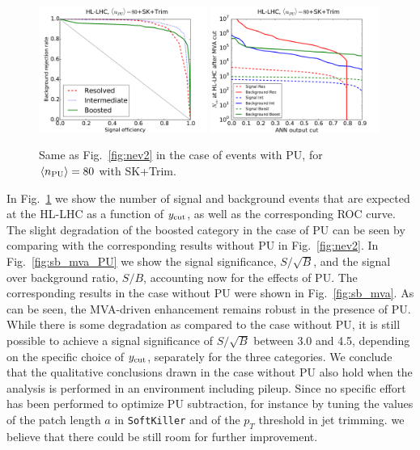 \begin{figure}[t]
  \begin{center}
    \includegraphics[width=0.49\textwidth]{plots/roc_SKPU80.pdf}
\includegraphics[width=0.49\textwidth]{plots/nev2_SKPU80.pdf}
\caption{\small Same as Fig.~\ref{fig:nev2} in the
case of events with PU, for
$\left\langle n_{\rm PU}\right\rangle=80$ with SK+Trim.
}
\label{fig:nev2_PU}
\end{center}
\end{figure}

In Fig.~\ref{fig:nev2_PU}
we show the number of signal and background events that
are expected at the HL-LHC as a function of
$y_{\rm cut}$, as well as the corresponding ROC curve.
%
The slight degradation of the boosted category in the case
of PU can be seen by comparing with the corresponding
results without PU in Fig.~\ref{fig:nev2}.
%
In Fig.~\ref{fig:sb_mva_PU} we show the signal significance,
$S/\sqrt{B}$, and the signal over background ratio,
$S/B$, accounting now for the effects of PU.
%
The corresponding results in the case without PU were shown in
Fig.~\ref{fig:sb_mva}.
%
As can be seen, the MVA-driven enhancement remains robust in the
presence of PU.
%
While
there is some degradation as compared to the case
without PU,
it is still possible to
achieve a signal significance of
 $S/\sqrt{B}$ between 3.0 and 4.5, depending on the
specific choice of $y_{\rm cut}$,
separately for the three categories.
%
We conclude that the qualitative conclusions drawn
in the case without PU also hold when the analysis
is performed in an environment including pileup.
%
Since no specific effort has been performed to
optimize PU subtraction, for instance by tuning the values
of the patch length $a$ in {\tt SoftKiller}
and of the $p_T$ threshold in jet trimming.
we believe that
there could be still room for further  improvement.


